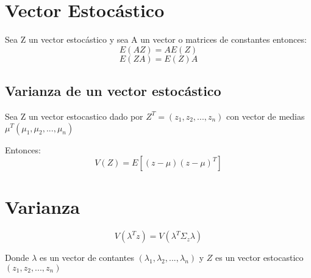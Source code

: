
\section{Vector Estocástico}
 
Sea Z un vector estocástico y sea A un vector o matrices de constantes entonces:
$$E(AZ) = AE(Z)$$
$$E(ZA) = E(Z)A$$

\subsection{Varianza de un vector estocástico}

Sea Z un vector estocastico dado por $Z^T=(z_1, z_2, ..., z_n)$ con vector de medias $\mu^T (\mu_1, \mu_2, ..., \mu_n)$

Entonces: 
$$ V(Z) = E[(z-\mu) (z-\mu)^T]$$

\section{Varianza}

$$V(\lambda^T z) =V(\lambda^T \Sigma_z \lambda)$$

Donde $\lambda$ es un vector de contantes $(\lambda_1, \lambda_2, ... ,\lambda_n)$ y $Z$ es un vector estocastico $(z_1, z_2, ... , z_n)$







